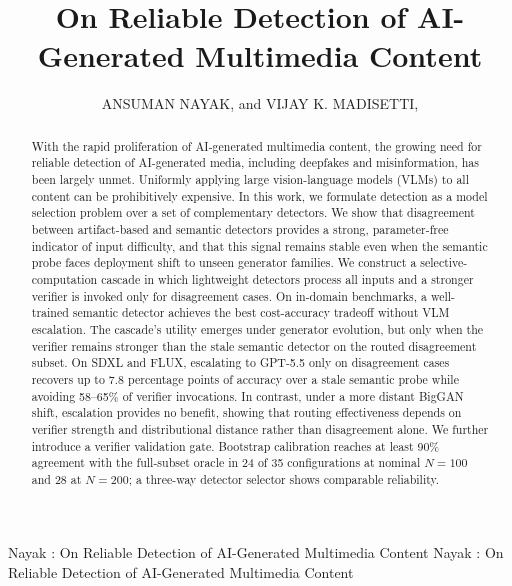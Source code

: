 \documentclass{ieeeaccess}
\begin{document}


\title{On Reliable Detection of AI-Generated Multimedia Content}
\author{\uppercase{Ansuman Nayak}, and 
\uppercase{Vijay K. Madisetti}, }

\address[1]{College of Computing, Georgia Institute of Technology, Atlanta, GA 30332 USA (e-mail: anayak306@gatech.edu)}
\address[2]{School of Cybersecurity and Privacy, Georgia Institute of Technology, Atlanta, GA 30332 USA (e-mail: vkm@gatech.edu)}

\markboth
{Nayak \headeretal: On Reliable Detection of AI-Generated Multimedia Content}
{Nayak \headeretal: On Reliable Detection of AI-Generated Multimedia Content}



\begin{abstract}
With the rapid proliferation of AI-generated multimedia content, the growing need for reliable detection of AI-generated media, including deepfakes and misinformation, has been largely unmet. Uniformly applying large vision-language models (VLMs) to all content can be prohibitively expensive. In this work, we formulate detection as a model selection problem over a set of complementary detectors. We show that disagreement between artifact-based and semantic detectors provides a strong, parameter-free indicator of input difficulty, and that this signal remains stable even when the semantic probe faces deployment shift to unseen generator families. We construct a selective-computation cascade in which lightweight detectors process all inputs and a stronger verifier is invoked only for disagreement cases. On in-domain benchmarks, a well-trained semantic detector achieves the best cost-accuracy tradeoff without VLM escalation. The cascade's utility emerges under generator evolution, but only when the verifier remains stronger than the stale semantic detector on the routed disagreement subset. On SDXL and FLUX, escalating to GPT-5.5 only on disagreement cases recovers up to 7.8 percentage points of accuracy over a stale semantic probe while avoiding 58--65\% of verifier invocations. In contrast, under a more distant BigGAN shift, escalation provides no benefit, showing that routing effectiveness depends on verifier strength and distributional distance rather than disagreement alone. We further introduce a verifier validation gate. Bootstrap calibration reaches at least 90\% agreement with the full-subset oracle in 24 of 35 configurations at nominal $N=100$ and 28 at $N=200$; a three-way detector selector shows comparable reliability.

\end{abstract}
\end{document}
